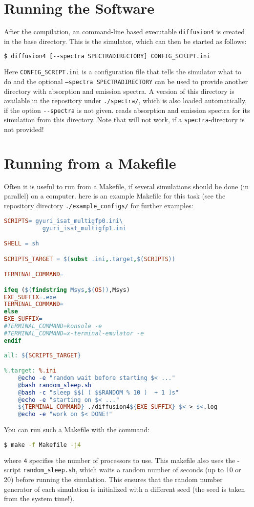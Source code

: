 \section{Running the Software \df}
\label{sec:RunningTheSoftware}
After the compilation, an command-line based executable \texttt{diffusion4} is created in the base directory. This is the simulator, which can then be started as follows:
\begin{lstlisting}[language=bash] 
$ diffusion4 [--spectra SPECTRADIRECTORY] CONFIG_SCRIPT.ini 
\end{lstlisting}
Here \texttt{CONFIG\_SCRIPT.ini} is a configuration file that tells the simulator what to do and the optional \texttt{--spectra SPECTRADIRECTORY} can be used to provide another directory with absorption and emission spectra. A version of this directory is available in the repository under \verb!./spectra/!, which is also loaded automatically, if the option \verb!--spectra! is not given. \df reads absorption and emission spectra for its simulation from this directory. Note that \df will not work, if a \texttt{spectra}-directory is not provided!

\section{Running \df from a Makefile}
\label{sec:RunningDfFromAMakefile}
Often it is useful to run \df from a Makefile, if several simulations should be done (in parallel) on a computer. here is an example Makefile for this task (see the repository directory \texttt{./example\_configs/} for further examples:
\begin{lstlisting}[language=make] 
SCRIPTS= gyuri_isat_multigfp0.ini\
	       gyuri_isat_multigfp1.ini 

SHELL = sh

SCRIPTS_TARGET = $(subst .ini,.target,$(SCRIPTS))

TERMINAL_COMMAND=		

ifeq ($(findstring Msys,$(OS)),Msys)
EXE_SUFFIX=.exe
TERMINAL_COMMAND=
else
EXE_SUFFIX=
#TERMINAL_COMMAND=konsole -e 
#TERMINAL_COMMAND=x-terminal-emulator -e 
endif		
		 
all: ${SCRIPTS_TARGET}

%.target: %.ini
	@echo -e "random wait before starting $< ..."
	@bash random_sleep.sh
	@bash -c "sleep $$[ ( $$RANDOM % 10 )  + 1 ]s"
	@echo -e "starting on $< ..."
	${TERMINAL_COMMAND} ./diffusion4${EXE_SUFFIX} $< > $<.log
	@echo -e "work on $< DONE!"
\end{lstlisting}
You can run such a Makefile with the command:
\begin{lstlisting}[language=bash] 
$ make -f Makefile -j4
\end{lstlisting}
where \texttt{4} specifies the number of processors to use. This makefile also uses the \bash-script \texttt{random\_sleep.sh}, which waits a random number of seconds (up to 10 or 20) before running  the simulation. This ensures that the random number generator of each simulation is initialized with a different seed (the seed is taken from the system time!).
